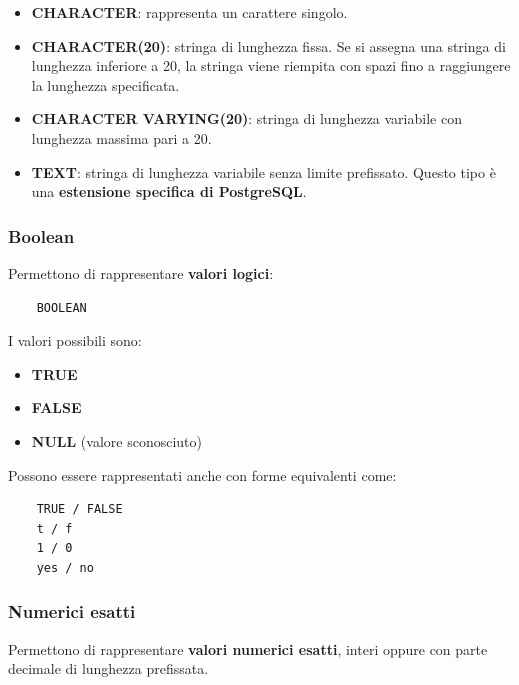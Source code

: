 \begin{itemize}
	
	\item \textbf{CHARACTER}: rappresenta un carattere singolo.
	
	\item \textbf{CHARACTER(20)}: stringa di lunghezza fissa.  
	Se si assegna una stringa di lunghezza inferiore a 20, la stringa viene riempita con spazi fino a raggiungere la lunghezza specificata.
	
	\item \textbf{CHARACTER VARYING(20)}: stringa di lunghezza variabile con lunghezza massima pari a 20.
	
	\item \textbf{TEXT}: stringa di lunghezza variabile senza limite prefissato.  
	Questo tipo è una \textbf{estensione specifica di PostgreSQL}.
	
\end{itemize}

\subsubsection*{Boolean}

Permettono di rappresentare \textbf{valori logici}:

\begin{verbatim}
	BOOLEAN
\end{verbatim}

I valori possibili sono:

\begin{itemize}
	
	\item \textbf{TRUE}
	\item \textbf{FALSE}
	\item \textbf{NULL} (valore sconosciuto)
	
\end{itemize}

Possono essere rappresentati anche con forme equivalenti come:

\begin{verbatim}
	TRUE / FALSE
	t / f
	1 / 0
	yes / no
\end{verbatim}

\subsubsection*{Numerici esatti}

Permettono di rappresentare \textbf{valori numerici esatti}, interi oppure con parte decimale di lunghezza prefissata.

